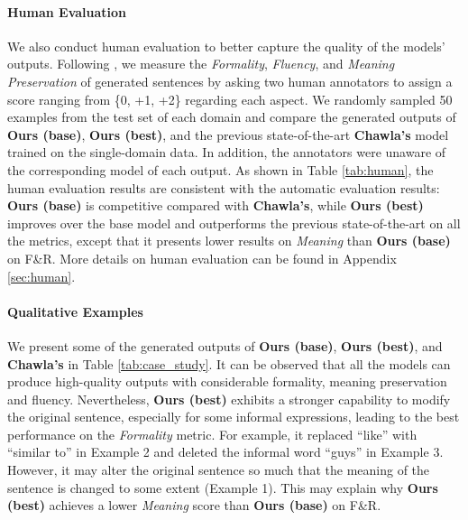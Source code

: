 \paragraph{Human Evaluation} We also conduct human evaluation to better capture the quality of the models' outputs. Following \citep{zhang2020parallel}, we measure the \textit{Formality}, \textit{Fluency}, and \textit{Meaning Preservation} of generated sentences by asking two human annotators to assign a score ranging from \{0, +1, +2\} regarding each aspect. We randomly sampled 50 examples from the test set of each domain and compare the generated outputs of \textbf{Ours (base)}, \textbf{Ours (best)}, and the previous state-of-the-art \textbf{Chawla's} model trained on the single-domain data. In addition, the annotators were unaware of the corresponding model of each output. As shown in Table \ref{tab:human}, the human evaluation results are consistent with the automatic evaluation results: \textbf{Ours (base)} is competitive compared with \textbf{Chawla's}, while \textbf{Ours (best)} improves over the base model and outperforms the previous state-of-the-art on all the metrics, except that it presents lower results on \textit{Meaning} than \textbf{Ours (base)} on F\&R. More details on human evaluation can be found in Appendix \ref{sec:human}.

\paragraph{Qualitative Examples} We present some of the generated outputs of \textbf{Ours (base)}, \textbf{Ours (best)}, and \textbf{Chawla's} in Table \ref{tab:case_study}. It can be observed that all the models can produce high-quality outputs with considerable formality, meaning preservation and fluency. Nevertheless, \textbf{Ours (best)} exhibits a stronger capability to modify the original sentence, especially for some informal expressions, leading to the best performance on the \textit{Formality} metric. For example, it replaced ``like'' with ``similar to'' in Example 2 and deleted the informal word ``guys'' in Example 3. However, it may alter the original sentence so much that the meaning of the sentence is changed to some extent (Example 1). This may explain why \textbf{Ours (best)} achieves a lower \textit{Meaning} score than \textbf{Ours (base)} on F\&R.




